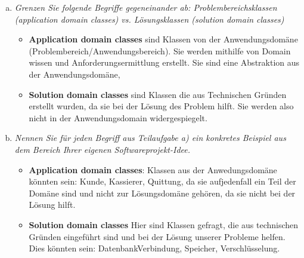 \begin{enumerate}[(a)]
    \item {\itshape Grenzen Sie folgende Begriffe gegeneinander ab: Problembereichsklassen (application domain classes) vs. Lösungsklassen (solution domain classes)}
    \begin{itemize}
        \item \textbf{Application domain classes} sind Klassen von der Anwendungsdomäne (Problembereich/Anwendungsbereich). Sie werden mithilfe von Domain wissen und Anforderungsermittlung erstellt. Sie sind eine Abstraktion aus der Anwendungsdomäne,
        \item \textbf{Solution domain classes} sind Klassen die aus Technischen Gründen erstellt wurden, da sie bei der Lösung des Problem hilft. Sie werden also nicht in der Anwendungsdomain widergespiegelt. 
    \end{itemize}
   
    \item {\itshape Nennen Sie für jeden Begriff aus Teilaufgabe a) ein konkretes Beispiel aus dem Bereich Ihrer eigenen Softwareprojekt-Idee.}
    \begin{itemize}
            \item \textbf{Application domain classes}: Klassen aus der Anwedungsdomäne könnten sein: Kunde, Kassierer, Quittung, da  sie aufjedenfall ein Teil der Domäne sind und nicht zur Lösungsdomäne gehören, da sie nicht bei der Lösung hilft.
            \item \textbf{Solution domain classes} Hier sind Klassen gefragt, die aus technischen Gründen eingeführt sind und bei der Lösung unserer Probleme helfen. Dies könnten sein: DatenbankVerbindung, Speicher, Verschlüsselung.
        \end{itemize}
   

\end{enumerate}
